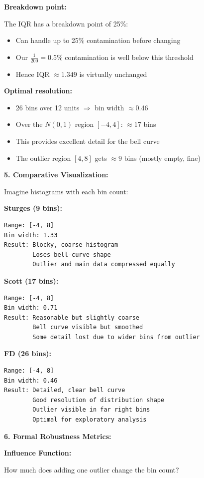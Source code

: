 \documentclass[12pt]{article}
\begin{document}
\begin{explanation}
\textbf{Breakdown point:}

The IQR has a breakdown point of 25\%:
\begin{itemize}
    \item Can handle up to 25\% contamination before changing
    \item Our \(\frac{1}{200} = 0.5\%\) contamination is well below this threshold
    \item Hence IQR \(\approx 1.349\) is virtually unchanged
\end{itemize}

\textbf{Optimal resolution:}
\begin{itemize}
    \item 26 bins over 12 units \(\Rightarrow\) bin width \(\approx 0.46\)
    \item Over the \(N(0,1)\) region \([-4, 4]\): \(\approx 17\) bins
    \item This provides excellent detail for the bell curve
    \item The outlier region \([4, 8]\) gets \(\approx 9\) bins (mostly empty, fine)
\end{itemize}

\textbf{5. Comparative Visualization:}

Imagine histograms with each bin count:

\textbf{Sturges (9 bins):}
\begin{verbatim}
Range: [-4, 8]
Bin width: 1.33
Result: Blocky, coarse histogram
        Loses bell-curve shape
        Outlier and main data compressed equally
\end{verbatim}

\textbf{Scott (17 bins):}
\begin{verbatim}
Range: [-4, 8]
Bin width: 0.71
Result: Reasonable but slightly coarse
        Bell curve visible but smoothed
        Some detail lost due to wider bins from outlier
\end{verbatim}

\textbf{FD (26 bins):}
\begin{verbatim}
Range: [-4, 8]
Bin width: 0.46
Result: Detailed, clear bell curve
        Good resolution of distribution shape
        Outlier visible in far right bins
        Optimal for exploratory analysis
\end{verbatim}

\textbf{6. Formal Robustness Metrics:}

\textbf{Influence Function:}

How much does adding one outlier change the bin count?


\end{explanation}
\end{document}
